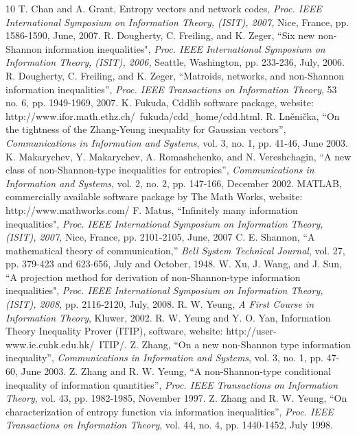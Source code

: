 \documentclass[10pt,journal]{IEEEtran}
\begin{document}
\begin{thebibliography}{10}
%
T. Chan and A. Grant, Entropy vectors and network codes,
\textit{Proc. IEEE International Symposium on Information Theory, (ISIT), 2007, }
Nice, France, pp. 1586-1590, June, 2007.
%
R. Dougherty, C. Freiling, and K. Zeger, ``Six new non-Shannon information inequalities",
\textit{Proc. IEEE International Symposium on Information Theory, (ISIT), 2006, }
Seattle, Washington, pp. 233-236, July, 2006.
%
R. Dougherty, C. Freiling, and K. Zeger,
``Matroids, networks, and non-Shannon information inequalities'',
\textit{Proc. IEEE Transactions on Information Theory}, 53 no. 6, pp. 1949-1969, 2007.
%
K. Fukuda, Cddlib
software package,
\newline
website: http://www.ifor.math.ethz.ch/~fukuda/cdd\_home/cdd.html.
%
R. Ln\v{e}ni\v{c}ka,
``On the tightness of the Zhang-Yeung inequality for Gaussian vectors'',
\textit{Communications in Information and Systems},
vol. 3, no. 1, pp. 41-46, June 2003.
%
K. Makarychev, Y. Makarychev, A. Romashchenko, and N. Vereshchagin,
``A new class of non-Shannon-type inequalities for entropies'',
\textit{Communications in Information and Systems},
vol. 2, no. 2, pp. 147-166, December 2002.
%
MATLAB, commercially available software package by The Math Works,
website: http://www.mathworks.com/
%
F. Matus, ``Infinitely many information inequalities",
\textit{Proc. IEEE International Symposium on Information Theory, (ISIT), 2007, }
Nice, France, pp. 2101-2105, June, 2007
%
C. E. Shannon,
``A mathematical theory of communication,''
\textit{Bell System Technical Journal},
vol. 27, pp. 379-423 and 623-656, July and October, 1948.
%
W. Xu, J. Wang, and J. Sun,
``A projection method for derivation of non-Shannon-type information inequalities",
\textit{Proc. IEEE International Symposium on Information Theory, (ISIT), 2008, }
pp. 2116-2120, July, 2008.
%
R. W. Yeung,
\textit{A First Course in Information Theory},
Kluwer, 2002.
%
R. W. Yeung and Y. O. Yan, Information Theory Inequality Prover (ITIP),
software,
website: http://user-www.ie.cuhk.edu.hk/~ITIP/.
%
Z. Zhang,
``On a new non-Shannon type information inequality'',
\textit{Communications in Information and Systems},
vol. 3, no. 1, pp. 47-60, June 2003.
%
Z. Zhang and R. W. Yeung,
``A non-Shannon-type conditional inequality of information quantities'',
\textit{Proc. IEEE Transactions on Information Theory},
vol. 43, pp. 1982-1985, November 1997.
%
Z. Zhang and R. W. Yeung,
``On characterization of entropy function via information inequalities'',
\textit{Proc. IEEE Transactions on Information Theory},
vol. 44, no. 4, pp. 1440-1452, July 1998.

\end{thebibliography}
\end{document}
